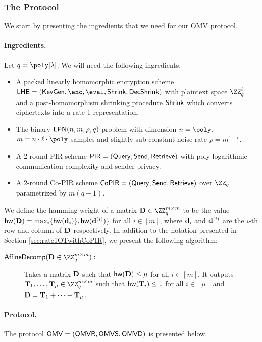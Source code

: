 \subsubsection{The Protocol}

We start by presenting the ingredients that we need for our OMV protocol.

\paragraph{Ingredients.} Let $q=\poly[\lambda]$. We will need the following ingredients.
\begin{itemize}
    \item A packed linearly homomorphic encryption scheme $\LHE = (\keygen,\enc,\eval,\shrink,\decshrink)$ with plaintext space $\ZZ_q^\ell$ and a post-homomorphism shrinking procedure $\mathsf{Shrink}$ which converts ciphertexts into a rate 1 representation.%
    \item The binary $\mathsf{LPN}(n,m,\rho,q)$ problem with dimension $n = \poly$, $m = n \cdot \ell \cdot \poly$ samples and slightly sub-constant noise-rate $\rho = m^{1 - \epsilon}$.
    \item A 2-round PIR scheme $\mathsf{PIR} = (\mathsf{Query},\mathsf{Send},\mathsf{Retrieve})$ with poly-logarithmic communication complexity and sender privacy.
    \item A 2-round Co-PIR scheme $\mathsf{CoPIR}=(\mathsf{Query},\mathsf{Send},\mathsf{Retrieve})$ over $\ZZ_q$ parametrized by $m(q-1)$.
\end{itemize}


We define the hamming weight of a matrix $\Dn\in\ZZ_q^{m\times m}$ to be the value $\mathsf{hw}(\mathbf{D})=\max_i\{\mathsf{hw}(\mathbf{d}_i)\},\mathsf{hw}(\mathbf{d}^{(i)})\}$ for all $i\in[m]$, where $\mathbf{d}_i$ and $\mathbf{d}^{(i)}$ are the $i$-th row and column of $\mathbf{D}$ respectively. 
In addition to the notation presented in Section \ref{sec:rate1OTwithCoPIR}, we present the following algorithm:
\begin{description}
\item[$\AffineDecomp(\Dn\in \ZZ_q^{m \times m}):$] Takes a matrix $\mathbf{D}$ such that $\mathsf{hw}(\mathbf{D})\leq \mu$ for all $i\in[m]$. It outputs $\Tn_1,\dots ,\Tn_\mu\in\ZZ_q^{m\times m}$ such that $\mathsf{hw}(\mathbf{T}_i)\leq 1$ for all $i\in[\mu]$ and $\mathbf{D}=\mathbf{T}_1 + \dots + \mathbf{T}_\mu$.
\end{description}


\paragraph{Protocol.} The protocol $\mathsf{OMV}=(\mathsf{OMVR},\mathsf{OMVS},\mathsf{OMVD})$ is presented below. 

